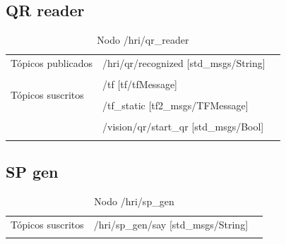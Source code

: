 \documentclass[a4paper,usenames,dvipsnames,svgnames,table]{book}
\begin{document}
\subsection{QR reader}

\begin{table}[H]
\begin{center}
\begin{tabular}{|l|p{6cm}|p{5cm}|}%
\hline

Tópicos publicados
& /hri/qr/recognized [std\_msgs/String] &  \\
& & \\
\hline

\multirow{3}{*}{Tópicos suscritos}
& /tf [tf/tfMessage] &  \\
& & \\
& /tf\_static [tf2\_msgs/TFMessage] &  \\
& & \\
& /vision/qr/start\_qr [std\_msgs/Bool] &  \\
& & \\
\cline{1-3}

\end{tabular}
\caption{Nodo /hri/qr\_reader}
\label{qr reader node}
\end{center}
\end{table}

\subsection{SP gen}

\begin{table}[H]
\begin{center}
\begin{tabular}{|l|p{6cm}|p{5cm}|}%
\hline

Tópicos suscritos
& /hri/sp\_gen/say [std\_msgs/String] &  \\
& & \\
\hline

\end{tabular}
\caption{Nodo /hri/sp\_gen}
\label{sp gen node}
\end{center}
\end{table}
\end{document}
